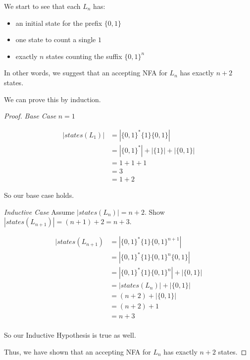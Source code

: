 \documentclass[12pt,letterpaper]{article}
\begin{document}
\begin{enumerate}
      We start to see that each $L_n$ has:
      \begin{itemize}
        \item an initial state for the prefix $\{0,1\}$
        \item one state to count a single $1$
        \item exactly $n$ states counting the suffix $\{0,1\}^n$
      \end{itemize}

      In other words, we suggest that an accepting NFA for $L_n$ has exactly $n + 2$ states.

      We can prove this by induction.

      \pagebreak

      \begin{proof}
        \textit{Base Case} $n = 1$

        \begin{align*}
          |states(L_1)| &= |\{0,1\}^*\{1\}\{0,1\}| \\
          &= |\{0,1\}^*| + |\{1\}| + |\{0,1\}| \\
          &= 1 + 1 + 1 \\
          &= 3 \\
          &= 1 + 2
        \end{align*}

        So our base case holds.

        \textit{Inductive Case} Assume $|states(L_n)| = n + 2$. Show $|states(L_{n+1})| = (n + 1) + 2 = n + 3$.

        \begin{align*}
          |states(L_{n+1}) &= |\{0,1\}^*\{1\}\{0,1\}^{n+1}| \\
          &= |\{0,1\}^*\{1\}\{0,1\}^n\{0,1\}| \\
          &= |\{0,1\}^*\{1\}\{0,1\}^n| + |\{0,1\}| \\
          &= |states(L_n)| + |\{0,1\}| \\
          &= (n + 2) + |\{0,1\}| \\
          &= (n + 2) + 1 \\
          &= n + 3 \\
        \end{align*}

        So our Inductive Hypothesis is true as well.

        Thus, we have shown that an accepting NFA for $L_n$ has exactly $n + 2$ states.
      \end{proof}


\end{enumerate}
\end{document}
